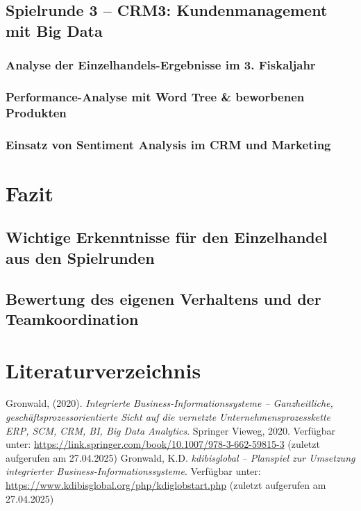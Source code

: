 \documentclass[a4paper,12pt]{article}
\begin{document}
\newpage
\subsection{Spielrunde 3 – CRM3: Kundenmanagement mit Big Data}
\subsubsection{Analyse der Einzelhandels-Ergebnisse im 3. Fiskaljahr}
\subsubsection{ Performance-Analyse mit Word Tree \& beworbenen Produkten}
\subsubsection{Einsatz von Sentiment Analysis im CRM und Marketing}

\newpage
\section{Fazit}
\subsection{Wichtige Erkenntnisse für den Einzelhandel aus den Spielrunden}
\subsection{Bewertung des eigenen Verhaltens und der Teamkoordination}

\newpage
{}
\section*{Literaturverzeichnis}
\begin{thebibliography}{99}
     Gronwald, (2020). \textit{Integrierte Business-Informationssysteme – Ganzheitliche, geschäftsprozessorientierte Sicht auf die vernetzte Unternehmensprozesskette ERP, SCM, CRM, BI, Big Data Analytics}. Springer Vieweg, 2020. Verfügbar unter: \url{https://link.springer.com/book/10.1007/978-3-662-59815-3} (zuletzt aufgerufen am 27.04.2025)
     Gronwald, K.D. \textit{kdibisglobal – Planspiel zur Umsetzung integrierter Business-Informationssysteme}. Verfügbar unter: \url{https://www.kdibisglobal.org/php/kdiglobstart.php} (zuletzt aufgerufen am 27.04.2025)
\end{thebibliography}
\end{document}
